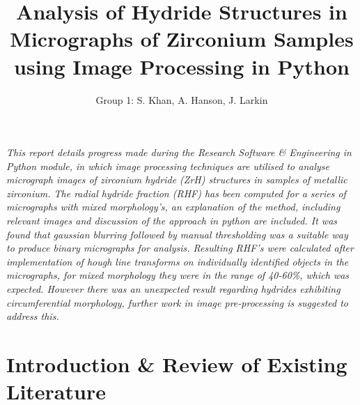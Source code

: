 \documentclass{article}
\title{Analysis of Hydride Structures in Micrographs of Zirconium Samples using Image Processing in Python}
\author{Group 1: S. Khan, A. Hanson, J. Larkin}
\begin{document}
	\maketitle
	
	\begin{center} \textit{This report details progress made during the Research Software \& Engineering in Python module, in which image processing techniques are utilised to analyse micrograph images of zirconium hydride (ZrH) structures in samples of metallic zirconium. The radial hydride fraction (RHF) has been computed for a series of micrographs with mixed morphology's, an explanation of the method, including relevant images and discussion of the approach in python are included. It was found that gaussian blurring followed by manual thresholding was a suitable way to produce binary micrographs for analysis. Resulting RHF's were calculated after implementation of hough line transforms on individually identified objects in the micrographs, for mixed morphology they were in the range of 40-60\%, which was expected. However there was an unexpected result regarding hydrides exhibiting circumferential morphology, further work in image pre-processing is suggested to address this.} \end{center}

\newpage
\tableofcontents
\newpage
	\section{Introduction \& Review of Existing Literature}
\end{document}
